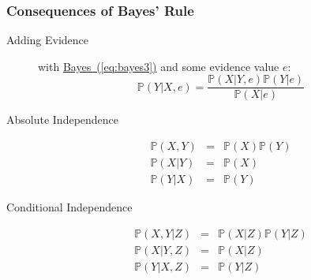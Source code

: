 \documentclass[xcolor=dvipsnames,ignorenonframetext]{beamer}
\newcommand{\Pb}{\mathbb{P}}
\begin{document}
\begin{frame}
  \frametitle{Consequences of Bayes' Rule}
  \begin{description}
  \item[Adding Evidence] with \hyperref[eq:bayes3]{Bayes~(\ref{eq:bayes3})} and
    some evidence value $e$:
    \begin{equation}
      \label{eq:new2}
      \Pb(Y|X, e) = \frac{\Pb(X|Y, e)\Pb(Y|e)}{\Pb(X|e)}
    \end{equation}
  \item[Absolute Independence]
    \begin{eqnarray}
 \Pb(X, Y) & = &  \Pb(X) \Pb(Y)\\
 \Pb(X| Y) & = &  \Pb(X)\\
 \Pb(Y| X) & = &  \Pb(Y)
    \end{eqnarray}
  \item[Conditional Independence] 
    \begin{eqnarray}
 \Pb(X, Y | Z) & = &  \Pb(X | Z) \Pb(Y | Z)\\
 \Pb(X | Y, Z) & = &  \Pb(X | Z)\\
 \Pb(Y | X, Z) & = &  \Pb(Y | Z)
    \end{eqnarray}
  \end{description}
\end{frame}
\end{document}
